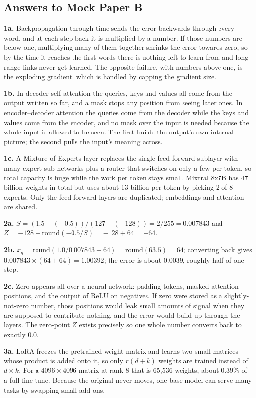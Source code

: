 \documentclass[11pt]{article}
\begin{document}
\subsection*{Answers to Mock Paper B}

\textbf{1a.} Backpropagation through time sends the error backwards through every word, and at
each step back it is multiplied by a number. If those numbers are below one, multiplying many
of them together shrinks the error towards zero, so by the time it reaches the first words
there is nothing left to learn from and long-range links never get learned. The opposite
failure, with numbers above one, is the exploding gradient, which is handled by capping the
gradient size.

\textbf{1b.} In decoder self-attention the queries, keys and values all come from the output
written so far, and a mask stops any position from seeing later ones. In encoder--decoder
attention the queries come from the decoder while the keys and values come from the encoder,
and no mask over the input is needed because the whole input is allowed to be seen. The first
builds the output's own internal picture; the second pulls the input's meaning across.

\textbf{1c.} A Mixture of Experts layer replaces the single feed-forward sublayer with many
expert sub-networks plus a router that switches on only a few per token, so total capacity is
huge while the work per token stays small. Mixtral 8x7B has 47 billion weights in total but
uses about 13 billion per token by picking 2 of 8 experts. Only the feed-forward layers are
duplicated; embeddings and attention are shared.

\textbf{2a.} $S=(1.5-(-0.5))/(127-(-128))=2/255=0.007843$ and
$Z=-128-\mathrm{round}(-0.5/S)=-128+64=-64$.

\textbf{2b.} $x_q=\mathrm{round}(1.0/0.007843-64)=\mathrm{round}(63.5)=64$; converting back
gives $0.007843\times(64+64)=1.00392$; the error is about $0.0039$, roughly half of one step.

\textbf{2c.} Zero appears all over a neural network: padding tokens, masked attention
positions, and the output of ReLU on negatives. If zero were stored as a slightly-not-zero
number, those positions would leak small amounts of signal when they are supposed to
contribute nothing, and the error would build up through the layers. The zero-point $Z$ exists
precisely so one whole number converts back to exactly $0.0$.

\textbf{3a.} LoRA freezes the pretrained weight matrix and learns two small matrices whose
product is added onto it, so only $r(d+k)$ weights are trained instead of $d\times k$. For a
$4096\times4096$ matrix at rank 8 that is 65{,}536 weights, about $0.39\%$ of a full
fine-tune. Because the original never moves, one base model can serve many tasks by swapping
small add-ons.
\end{document}
